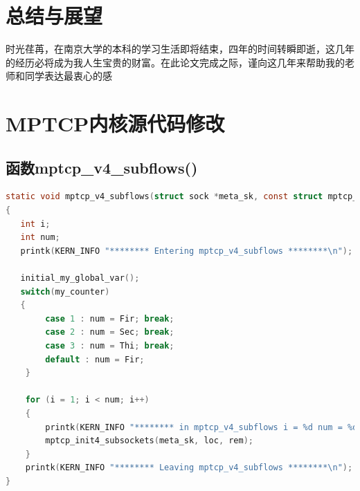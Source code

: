 \documentclass[winfonts,bachelor,oneside,nobackinfo]{njuthesis}
\begin{document}
\chapter{总结与展望}
\lipsum[1]



\begin{acknowledgement}
时光荏苒，在南京大学的本科的学习生活即将结束，四年的时间转瞬即逝，这几年的经历必将成为我人生宝贵的财富。在此论文完成之际，谨向这几年来帮助我的老师和同学表达最衷心的感

\end{acknowledgement}








\appendix
\chapter{MPTCP内核源代码修改}\label{app:1}
\section{函数mptcp\_v4\_subflows()}
\begin{lstlisting}[language=C]
static void mptcp_v4_subflows(struct sock *meta_sk, const struct mptcp_loc4 *loc, struct mptcp_rem4 *rem)
{
   int i;
   int num;
   printk(KERN_INFO "******** Entering mptcp_v4_subflows ********\n");
  
   initial_my_global_var();
   switch(my_counter)
   {   
		case 1 : num = Fir; break;
		case 2 : num = Sec; break;
		case 3 : num = Thi; break;
		default : num = Fir;
	}

	for (i = 1; i < num; i++) 
	{
		printk(KERN_INFO "******** in mptcp_v4_subflows i = %d num = %d********\n",i,num);
		mptcp_init4_subsockets(meta_sk, loc, rem);
	}
	printk(KERN_INFO "******** Leaving mptcp_v4_subflows ********\n");
}
\end{lstlisting} 
\end{document}
